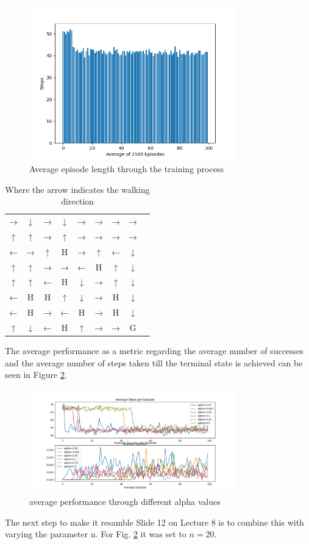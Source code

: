 \documentclass{article}
\begin{document}
\begin{figure}[H]
\centering
\includegraphics[width=0.8\textwidth]{images/avg_episode_length.png}
\caption{Average episode length through the training process}
\label{fig:avg}
\end{figure}

\begin{table}[H]
    \centering
    \begin{tabular}{ccccccccc}
        →& ↓& →& ↓& →& →& →& → \\
        ↑& ↑& →& ↑& →& →& →& → \\
        ←& →& ↑& H& →& ↑& ←& ↓ \\
        ↑& ↑& →& →& ←& H& ↑& ↓ \\
        ↑& ↑& ←& H& ↓& →& ↑& ↓ \\
        ←& H& H& ↑& ↓& →& H& ↓ \\
        ←& H& →& ←& H& →& H& ↓ \\
        ↑& ↓& ←& H& ↑& →& →& G 
    \end{tabular}
\caption{Where the arrow indicates the walking direction}
\label{tab:policy}
\end{table}

The average performance as a metric regarding the average number of successes and the average number of steps taken till the terminal state is achieved can be seen in Figure \ref{fig:perform}.

\begin{figure}[H]
\centering
\includegraphics[width=0.8\textwidth]{images/performance.png}
\caption{average performance through different alpha values}
\label{fig:perform}
\end{figure}

The next step to make it resamble Slide 12 on Lecture 8 is to combine this with varying the parameter n. For Fig. \ref*{fig:perform} it was set to $n=20$. 
\end{document}
